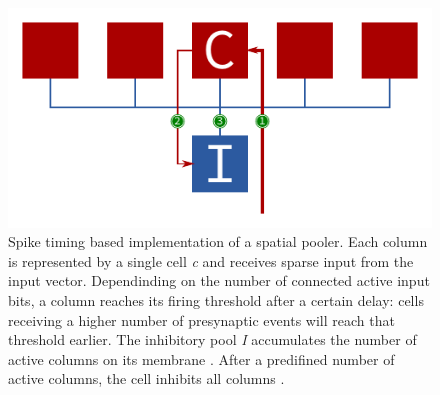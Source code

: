\begin{figure}
	\begin{center}
		\includegraphics{../circuitry/spatial_pooler_2.pdf}
	\end{center}
	\caption{Spike timing based implementation of a spatial pooler. Each column is represented by a single cell \emph{c} and receives sparse input \protect{} from the input vector. Dependinding on the number of connected active input bits, a column reaches its firing threshold after a certain delay: cells receiving a higher number of presynaptic events will reach that threshold earlier. The inhibitory pool \emph{I} accumulates the number of active columns on its membrane \protect{}. After a predifined number of active columns, the cell inhibits all columns \protect{}.}
	\label{fig:static_timing_spatial_pooler}
\end{figure}

